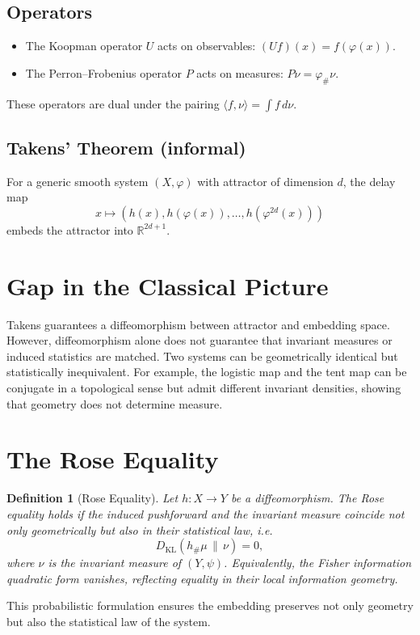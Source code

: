 \documentclass[11pt]{article}
\newtheorem{definition}{Definition}
\begin{document}
\subsection{Operators}
\begin{itemize}
  \item The Koopman operator $U$ acts on observables: $(Uf)(x) = f(\varphi(x))$.
  \item The Perron--Frobenius operator $P$ acts on measures: $P\nu = \varphi_{\#}\nu$.
\end{itemize}
These operators are dual under the pairing $\langle f, \nu \rangle = \int f \, d\nu$.

\subsection{Takens' Theorem (informal)}
For a generic smooth system $(X, \varphi)$ with attractor of dimension $d$, the delay map
\[
  x \mapsto (h(x), h(\varphi(x)), \dots, h(\varphi^{2d}(x)))
\]
embeds the attractor into $\mathbb{R}^{2d+1}$.

\section{Gap in the Classical Picture}
Takens guarantees a diffeomorphism between attractor and embedding space. However, diffeomorphism alone does not guarantee that invariant measures or induced statistics are matched. Two systems can be geometrically identical but statistically inequivalent. For example, the logistic map and the tent map can be conjugate in a topological sense but admit different invariant densities, showing that geometry does not determine measure.

\section{The Rose Equality}
\begin{definition}[Rose Equality]
Let $h: X \to Y$ be a diffeomorphism. The \emph{Rose equality} holds if the induced pushforward and the invariant measure coincide not only geometrically but also in their statistical law, i.e.
\[
  D_{\mathrm{KL}}(h_{\#}\mu \,\|\, \nu) = 0,
\]
where $\nu$ is the invariant measure of $(Y, \psi)$. Equivalently, the Fisher information quadratic form vanishes, reflecting equality in their local information geometry.
\end{definition}

This probabilistic formulation ensures the embedding preserves not only geometry but also the statistical law of the system.
\end{document}
